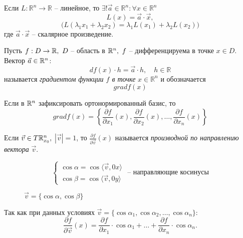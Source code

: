 \begin{statement}
    Если $L:\mathbb{R}^n \rightarrow \mathbb{R}$ -- линейное, то $\exists ! \vec{a}\in \mathbb{R}^n: \forall x \in \mathbb{R}^n$
    \[
        L(x) = \vec{a}\cdot \vec{x},
    \]
    \[
        \big(L(\lambda_1 x_1 + \lambda_2 x_2) = \lambda_1L(x_1) + \lambda_2 L(x_2)\big)
    \]
    где $\vec{a}\cdot \vec{x}$ -- скалярное произведение.
\end{statement}

\newpage

\begin{definition}
    Пусть $f:D\rightarrow \mathbb{R}, \ D$ -- область в $\mathbb{R}^n, \ f$ -- дифференцируема в точке $x \in D$. Вектор $\vec{a} \in \mathbb{R}^n$:
    \[
        df(x)\cdot h = \vec{a} \cdot h, \quad h \in \mathbb{R}
    \]
    называется \emph{градиентом функции $f$ в точке} $x \in \mathbb{R}^n$ и обозначается
    \[
        gradf(x)
    \]

    Если в $\mathbb{R}^n$ зафиксировать ортонормированный базис, то
    \[
        gradf(x) = \left\{\frac{\partial f}{\partial x_1}(x),\frac{\partial f}{\partial x_2}(x),\ldots,\frac{\partial f}{\partial x_n}(x)\right\}
    \]
\end{definition}

\begin{definition}
    Если $ \vec{v}\in T\mathbb{R}_{x_0}^n, $ $ |\vec{v}| = 1 $, то $ \frac{\partial f}{\partial \vec{v}}(x) $ называется \emph{производной по направлению вектора} $ \vec{v} $.
\end{definition}

\begin{example}
    \[
        \left\{\begin{array}{l}
            \cos\alpha = \cos\langle \vec{v},0x \rangle \\
            \cos\beta = \cos\langle \vec{v},0y \rangle
        \end{array}\right.\text{ -- направляющие косинусы}
    \]
    \begin{figure}[H]
        \centering
        \caption{$ \vec{v}=\{\cos\alpha,\cos\beta\} $}
        \label{fig:fig_01}
    \end{figure}

    Так как при данных условиях $ \vec{v} = \{\cos\alpha_1,\cos\alpha_2,\ldots,\cos\alpha_n\} $:
    \[
        \frac{\partial f}{\partial \vec{v}}(x)=\frac{\partial f}{\partial x_1}\cdot \cos\alpha_1 + \ldots + \frac{\partial f}{\partial x_n}\cdot \cos\alpha_n.
    \]
\end{example}

